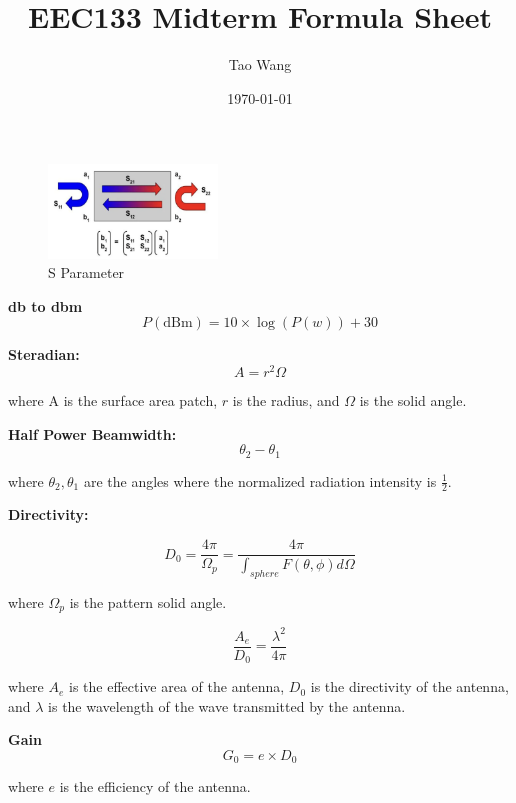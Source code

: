 \documentclass{article} %
\begin{document}
\title{EEC133 Midterm Formula Sheet}
\author{Tao Wang}
\date{\today}

\maketitle

\begin{figure}[H]
    \centering
    \includegraphics[width=0.4\textwidth]{./image/figure1.png}
    \caption{S Parameter}
\end{figure}

\textbf{db to dbm}
\[P(\text{dBm}) = 10 \times \log(P(w)) + 30\]

\textbf{Steradian:}
\[A = r^2 \Omega\]

\begin{center}
    where A is the surface area patch, $r$ is the radius, and $\Omega$ is the solid angle.
\end{center}


\textbf{Half Power Beamwidth:}
\[\theta_2 - \theta_1\]

\begin{center}
    where $\theta_2, \theta_1$ are the angles where the normalized radiation intensity is $\frac{1}{2}$.
\end{center}

\textbf{Directivity:}

\[D_0 = \frac{4 \pi}{\Omega_p} = \frac{4 \pi}{\int_{sphere} F(\theta, \phi) d\Omega}\]

\begin{center}
    where $\Omega_p$ is the pattern solid angle.
\end{center}

\[\frac{A_e}{D_0} = \frac{\lambda^2}{4 \pi}\]

\begin{center}
    where $A_e$ is the effective area of the antenna, $D_0$ is the directivity of the antenna, and $\lambda$ is the wavelength of the wave transmitted by the antenna.
\end{center}

\textbf{Gain}
\[G_0 = e \times D_0\]

\begin{center}
    where $e$ is the efficiency of the antenna.
\end{center}
\end{document}
